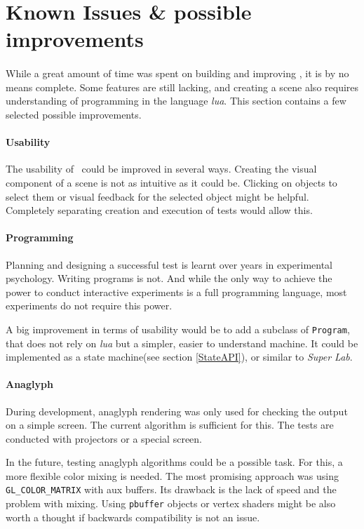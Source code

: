 \section[Issues \& improvements]{Known Issues \& possible improvements\label{Issues}}
\paragraph{}
While a great amount of time was spent on building and improving \ER, it is by no means complete.
Some features are still lacking, and creating a scene also requires understanding of programming in the language \textit{lua}.
This section contains a few selected possible improvements.

\paragraph{Usability}
The usability of \ER\ could be improved in several ways.
Creating the visual component of a scene is not as intuitive as it could be.
Clicking on objects to select them or visual feedback for the selected object might be helpful.
Completely separating creation and execution of tests would allow this.

\paragraph{Programming}
Planning and designing a successful test is learnt over years in experimental psychology.
Writing programs is not.
And while the only way to achieve the power to conduct interactive experiments is a full programming language, most experiments do not require this power.

A big improvement in terms of usability would be to add a subclass of \lstinline{Program}, that does not rely on \textit{lua} but a simpler, easier to understand machine.
It could be implemented as a state machine(see section \ref{StateAPI}), or similar to \textit{Super Lab}\cite{superlab}.

\paragraph{Anaglyph}
During development, anaglyph rendering was only used for checking the output on a simple screen.
The current algorithm is sufficient for this.
The tests are conducted with projectors or a special screen.

In the future, testing anaglyph algorithms could be a possible task.
For this, a more flexible color mixing is needed.
The most promising approach was using \lstinline{GL_COLOR_MATRIX} with aux buffers.
Its drawback is the lack of speed and the problem with mixing.
Using \lstinline{pbuffer} objects or vertex shaders might be also worth a thought if backwards compatibility is not an issue.

